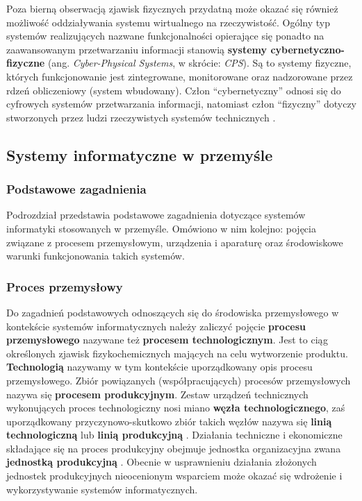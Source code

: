 \documentclass[a4paper, 12pt, twoside]{article}
\begin{document}
Poza bierną obserwacją zjawisk fizycznych przydatną może okazać się również
możliwość oddziaływania systemu wirtualnego na rzeczywistość. Ogólny typ systemów
realizujących nazwane funkcjonalności opierające się ponadto na zaawansowanym przetwarzaniu informacji
stanowią \textbf{systemy cybernetyczno-fizyczne}
(ang. \emph{Cyber-Physical Systems}, w skrócie: \emph{CPS}).
Są to systemy fizyczne, których funkcjonowanie jest zintegrowane, monitorowane oraz 
nadzorowane przez rdzeń obliczeniowy (system wbudowany). Człon ``cybernetyczny'' odnosi
się do cyfrowych systemów przetwarzania informacji, natomiast człon ``fizyczny'' 
dotyczy stworzonych przez ludzi rzeczywistych systemów technicznych \cite{iiot-cyber-manufacturing-systems}. 

\subsection{Systemy informatyczne w przemyśle} \label{isp}

\subsubsection{Podstawowe zagadnienia}

Podrozdział przedstawia podstawowe zagadnienia dotyczące systemów informatyki
stosowanych w przemyśle. Omówiono w nim kolejno: pojęcia związane z procesem przemysłowym,
urządzenia i aparaturę oraz środowiskowe warunki funkcjonowania takich systemów.

\subsubsection*{Proces przemysłowy} 

Do zagadnień podstawowych odnoszących się do środowiska przemysłowego w kontekście 
systemów informatycznych należy zaliczyć pojęcie \textbf{procesu przemysłowego} 
nazywane też \textbf{procesem technologicznym}.
Jest to ciąg określonych zjawisk fizykochemicznych mających na celu wytworzenie
produktu. \textbf{Technologią} nazywamy w tym kontekście uporządkowany opis procesu przemysłowego.
Zbiór powiązanych (współpracujących) procesów przemysłowych nazywa się 
\textbf{procesem produkcyjnym}. Zestaw urządzeń technicznych wykonujących
proces technologiczny nosi miano \textbf{węzła technologicznego}, zaś
uporządkowany przyczynowo-skutkowo zbiór takich węzłów nazywa się \textbf{linią technologiczną}
lub \textbf{linią produkcyjną} \cite{isp}. Działania techniczne i ekonomiczne
składające się na proces produkcyjny obejmuje jednostka organizacyjna zwana
\textbf{jednostką produkcyjną} \cite{jednostka-produkcyjna}. Obecnie w usprawnieniu
działania złożonych jednostek produkcyjnych nieocenionym wsparciem może okazać się
wdrożenie i wykorzystywanie systemów informatycznych.
\end{document}
